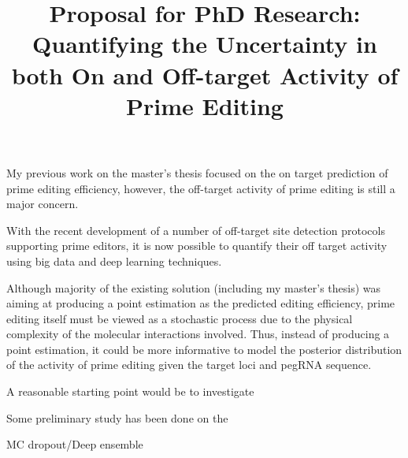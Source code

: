 \documentclass[a4,12pt]{article}
\title{Proposal for PhD Research: Quantifying the Uncertainty in both On and Off-target Activity of Prime Editing}
\author{}
\date{}
\begin{document}
\maketitle

My previous work on the master's thesis focused on the on target prediction of prime editing efficiency, however, the off-target activity of prime editing is still a major concern. 

With the recent development of a number of off-target site detection protocols supporting prime editors, it is now possible to quantify their off target activity using big data and deep learning techniques\parencite{liangGenomewideProfilingPrime2023,
zhuTrackingseqRevealsHeterogeneity2024}.

Although majority of the existing solution (including my master's thesis) was aiming at producing a point estimation as the predicted editing efficiency\parencite{mathisMachineLearningPrediction2024,yuPredictionEfficienciesDiverse2023,koeppelPredictionPrimeEditing2023}, prime editing itself must be viewed as a stochastic process due to the physical complexity of the molecular interactions involved. Thus, instead of producing a point estimation, it could be more informative to model the posterior distribution of the activity of prime editing given the target loci and pegRNA sequence.

A reasonable starting point would be to investigate 

Some preliminary study has been done on the  

MC dropout/Deep ensemble

\printbibliography
\end{document}

